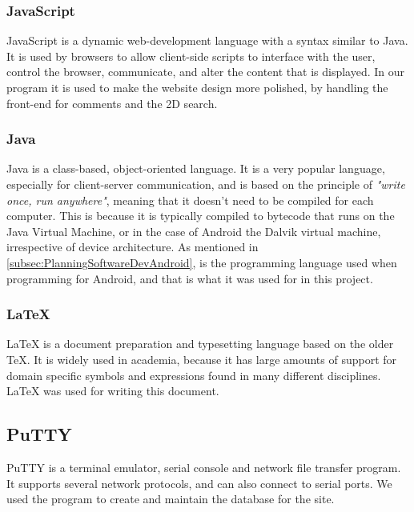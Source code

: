 \subsubsection{JavaScript} JavaScript is a dynamic web-development language with a syntax similar to Java. It is used by browsers to allow client-side scripts to interface with the user, control the browser, communicate, and alter the content that is displayed. In our program it is used to make the website design more polished, by handling the front-end for comments and the 2D search.

\subsubsection{Java} Java is a class-based, object-oriented language. It is a very popular language, especially for client-server communication, and is based on the principle of \emph{"write once, run anywhere"}, meaning that it doesn't need to be compiled for each computer. This is because it is typically compiled to bytecode that runs on the Java Virtual Machine, or in the case of Android the Dalvik virtual machine, irrespective of device architecture. As mentioned in \ref{subsec:PlanningSoftwareDevAndroid}, is the programming language used when programming for Android, and that is what it was used for in this project. 

\subsubsection{LaTeX} LaTeX is a document preparation and typesetting language based on the older TeX. It is widely used in academia, because it has large amounts of support for domain specific symbols and expressions found in many different disciplines. LaTeX was used for writing this document.

\subsection{PuTTY} 
\label{subsec:PlanningSoftwareDevPutty}

PuTTY is a terminal emulator, serial console and network file transfer program. It supports several network protocols, and can also connect to serial ports. We used the program to create and maintain the database for the site.

